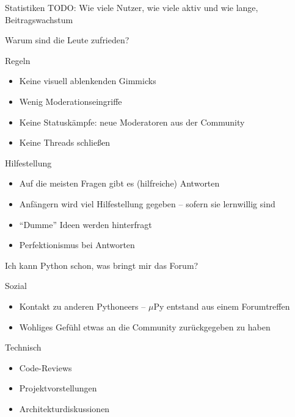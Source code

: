 \documentclass{beamer}
\begin{document}
\begin{frame}{Statistiken}
  TODO: Wie viele Nutzer, wie viele aktiv und wie lange, Beitragswachstum
\end{frame}

\begin{frame}{Warum sind die Leute zufrieden?}
  \begin{block}{Regeln}
    \begin{itemize}
      \item Keine visuell ablenkenden Gimmicks
      \item Wenig Moderationseingriffe
      \item Keine Statuskämpfe: neue Moderatoren aus der Community
      \item Keine Threads schließen
    \end{itemize}
  \end{block}
  \begin{block}{Hilfestellung}
    \begin{itemize}
      \item Auf die meisten Fragen gibt es (hilfreiche) Antworten
      \item Anfängern wird viel Hilfestellung gegeben – sofern sie lernwillig sind
      \item \enquote{Dumme} Ideen werden hinterfragt
      \item Perfektionismus bei Antworten
    \end{itemize}
  \end{block}
\end{frame}

\begin{frame}{Ich kann Python schon, was bringt mir das Forum?}
  \begin{block}{Sozial}
    \begin{itemize}
      \item Kontakt zu anderen Pythoneers – $\mu$Py entstand aus einem Forumtreffen
      \item Wohliges Gefühl etwas an die Community zurückgegeben zu haben 
    \end{itemize}
  \end{block}
  \begin{block}{Technisch}
    \begin{itemize}
      \item Code-Reviews
      \item Projektvorstellungen
      \item Architekturdiskussionen
    \end{itemize}
  \end{block}
\end{frame}
\end{document}
